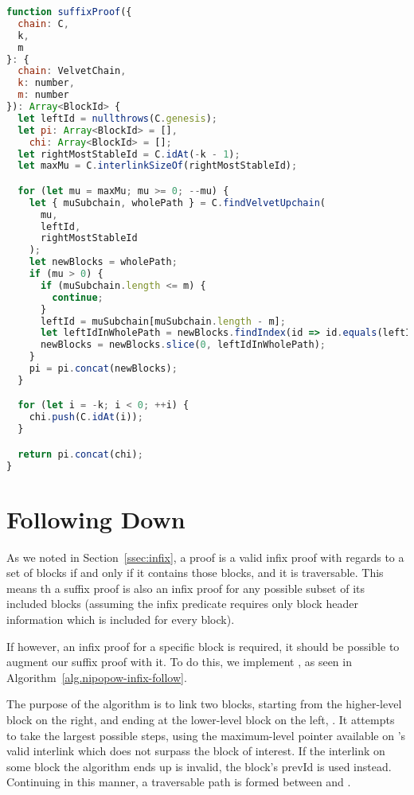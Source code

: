 \begin{lstlisting}[language=Javascript]
function suffixProof({
  chain: C,
  k,
  m
}: {
  chain: VelvetChain,
  k: number,
  m: number
}): Array<BlockId> {
  let leftId = nullthrows(C.genesis);
  let pi: Array<BlockId> = [],
    chi: Array<BlockId> = [];
  let rightMostStableId = C.idAt(-k - 1);
  let maxMu = C.interlinkSizeOf(rightMostStableId);

  for (let mu = maxMu; mu >= 0; --mu) {
    let { muSubchain, wholePath } = C.findVelvetUpchain(
      mu,
      leftId,
      rightMostStableId
    );
    let newBlocks = wholePath;
    if (mu > 0) {
      if (muSubchain.length <= m) {
        continue;
      }
      leftId = muSubchain[muSubchain.length - m];
      let leftIdInWholePath = newBlocks.findIndex(id => id.equals(leftId));
      newBlocks = newBlocks.slice(0, leftIdInWholePath);
    }
    pi = pi.concat(newBlocks);
  }

  for (let i = -k; i < 0; ++i) {
    chi.push(C.idAt(i));
  }

  return pi.concat(chi);
}
\end{lstlisting}

\section{Following Down}
As we noted in Section~\ref{ssec:infix}, a proof is a valid infix proof with regards to a set of blocks if and only if it contains those blocks, and it is traversable. This means th a suffix proof is also an infix proof for any possible subset of its included blocks (assuming the infix predicate requires only block header information which is included for every block).

If however, an infix proof for a specific block is required, it should be possible to augment our suffix proof with it. To do this, we implement , as seen in Algorithm~\ref{alg.nipopow-infix-follow}. 

The purpose of the algorithm is to link two blocks, starting from the higher-level block on the right,  and ending at the lower-level block on the left, . It attempts to take the largest possible steps, using the maximum-level pointer available on 's valid interlink which does not surpass the block of interest. If the interlink on some block the algorithm ends up is invalid, the block's \textsf{prevId} is used instead. Continuing in this manner, a traversable path is formed between  and .

